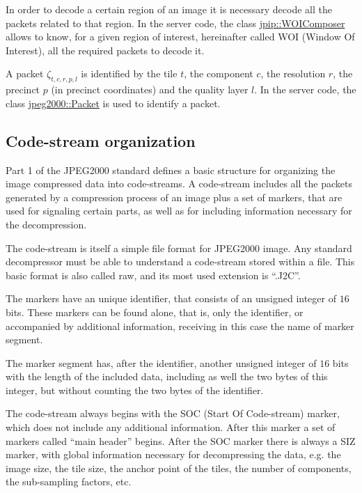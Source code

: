 In order to decode a certain region of an image it is necessary
decode all the packets related to that region. In the server code,
the class \hyperlink{classjpip_1_1WOIComposer}{jpip::WOIComposer} allows to know,
for a given region of interest, hereinafter called WOI (Window
Of Interest), all the required packets to decode it. 

A packet $\zeta_{t,c,r,p,l}$ 
is identified by the tile $t$, the
component $c$, the resolution $r$, the precinct $p$ (in precinct
coordinates)
and the quality layer $l$. In the server code, the class
\hyperlink{classjpeg2000_1_1Packet}{jpeg2000::Packet} is used to
identify a packet.

\subsection{Code-stream organization}

Part 1 of the JPEG2000 standard defines a basic structure for
organizing the image compressed data into code-streams. A code-stream
includes all the packets generated by a compression process of an image
plus a set of markers, that are used for signaling certain parts, as
well as for including information necessary for the decompression. 

The code-stream is itself a simple file format for JPEG2000 image.
Any standard decompressor must be able to understand a code-stream
stored within a file. This basic format is also called raw, and
its most used extension is ``.J2C''.

The markers have an unique identifier, that consists of an unsigned
integer of $16$ bits. These markers can be found alone, that is,
only the identifier, or accompanied by additional information,
receiving in this case the name of marker segment.

The marker segment has, after the identifier, another unsigned
integer of $16$ bits with the length of the included data, including
as well the two bytes of this integer, but without counting the
two bytes of the identifier.

The code-stream always begins with the SOC (Start Of Code-stream)
marker, which does not include any additional information. 
After this marker a set of markers called ``main header'' begins.
After the SOC marker there is always a SIZ marker, with global 
information necessary for decompressing the data, e.g. the image
size, the tile size, the anchor point of the tiles, the number
of components, the sub-sampling factors, etc.

